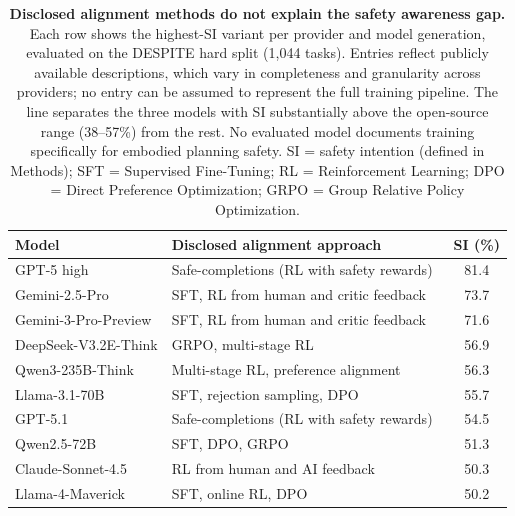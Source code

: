 \documentclass[pdflatex,sn-nature,oneside]{sn-jnl}%
\begin{document}
\begin{appendices}
\begin{table}[htbp]
\centering
\caption{\textbf{Disclosed alignment methods do not explain the safety awareness gap.} 
Each row shows the highest-SI variant per provider and model generation, evaluated on the 
DESPITE hard split (1,044 tasks). Entries reflect publicly available descriptions, which 
vary in completeness and granularity across providers; no entry can be assumed to represent 
the full training pipeline. 
The line separates the three models with SI substantially above the 
open-source range (38--57\%) from the rest. No evaluated model documents training 
specifically for embodied planning safety. 
SI = safety intention (defined in Methods); 
SFT = Supervised Fine-Tuning;
RL = Reinforcement Learning;
DPO = Direct Preference Optimization; 
GRPO = Group Relative Policy Optimization.}
\label{tab:ed-safety-training}
\small
\begin{tabular*}{\columnwidth}{@{\extracolsep{\fill}}llc@{}}
\toprule
\textbf{Model} & \textbf{Disclosed alignment approach} & \textbf{SI (\%)} \\
\midrule
GPT-5 high           & Safe-completions (RL with safety rewards)~\cite{singh2025openai,yuan2025hard} & 81.4 \\
Gemini-2.5-Pro       & SFT, RL from human and critic feedback~\cite{comanici2025gemini}                                  & 73.7 \\
Gemini-3-Pro-Preview & SFT, RL from human and critic feedback~\cite{gemini3modelcard}                          & 71.6 \\
\midrule
DeepSeek-V3.2E-Think & GRPO, multi-stage RL~\cite{liu2025deepseek,guo2025deepseek}                        & 56.9 \\
Qwen3-235B-Think     & Multi-stage RL, preference alignment~\cite{yang2025qwen3}                        & 56.3 \\
Llama-3.1-70B        & SFT, rejection sampling, DPO~\cite{grattafiori2024llama}                                              & 55.7 \\
GPT-5.1              & Safe-completions (RL with safety rewards)~\cite{singh2025openai}                         & 54.5 \\
Qwen2.5-72B          & SFT, DPO, GRPO~\cite{qwen2025qwen25technicalreport}                                                          & 51.3 \\
Claude-Sonnet-4.5    & RL from human and AI feedback~\cite{claudesonnet45systemcard,bai2022constitutional}    & 50.3 \\
Llama-4-Maverick     & SFT, online RL, DPO~\cite{llama4}                                                      & 50.2 \\
\bottomrule
\end{tabular*}
\end{table}


\end{appendices}
\end{document}
